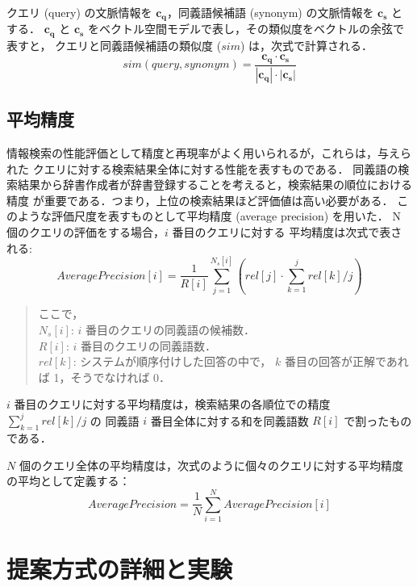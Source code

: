 \documentclass[japanese]{jnlp_1.4}
\begin{document}
クエリ (query) の文脈情報を $\boldsymbol{c_{q}}$，同義語候補語 (synonym) の文脈情報を $\boldsymbol{c_{s}}$ とする．
$\boldsymbol{c_{q}}$ と $\boldsymbol{c_{s}}$ をベクトル空間モデルで表し，その類似度をベクトルの余弦で表すと，
クエリと同義語候補語の類似度 ($sim$) は，次式で計算される．
\begin{equation}
sim(query,synonym) = \mathbf{\frac{c_{q} \cdot c_{s}}{|c_{q}| \cdot |c_{s}|}}
\end{equation}




\subsection{平均精度}

情報検索の性能評価として精度と再現率がよく用いられるが，これらは，与えられた
クエリに対する検索結果全体に対する性能を表すものである．
同義語の検索結果から辞書作成者が辞書登録することを考えると，検索結果の順位における精度
が重要である．つまり，上位の検索結果ほど評価値は高い必要がある．
このような評価尺度を表すものとして平均精度 (average precision) を用いた．
N 個のクエリの評価をする場合，$i$ 番目のクエリに対する
平均精度は次式で表される:
\begin{equation}
\mathit{Average Precision}[i] = \frac{1}{R[i]}\sum_{j=1}^{N_{s}[i]} (rel[j]\cdot \sum_{k=1}^{j} rel[k]/j)
\end{equation}

\begin{quote}
ここで，\\
$N_{s}[i]$: $i$ 番目のクエリの同義語の候補数．\\
$R[i]$: $i$ 番目のクエリの同義語数．\\
$rel[k]$: システムが順序付けした回答の中で，
$k$ 番目の回答が正解であれば 1，そうでなければ 0．
\end{quote}


$i$ 番目のクエリに対する平均精度は，検索結果の各順位での精度 $\sum_{k=1}^{j} rel[k]/j$ の
同義語 $i$ 番目全体に対する和を同義語数 $R[i]$ で割ったものである．

$N$ 個のクエリ全体の平均精度は，次式のように個々のクエリに対する平均精度の平均として定義する：
\begin{equation}
 \mathit{Average Precision} = \frac{1}{N}\sum_{i=1}^{N} \mathit{Average Precision}[i]
\end{equation}




\section{提案方式の詳細と実験}
\end{document}
